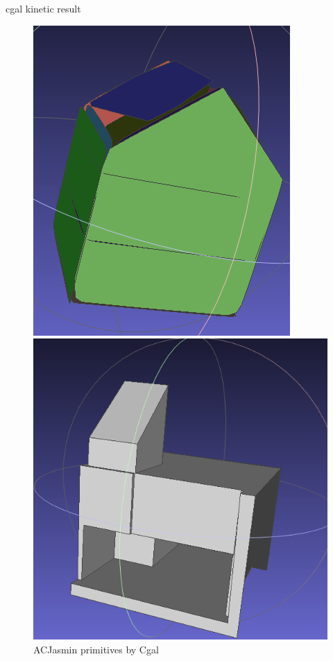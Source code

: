\documentclass[10pt]{beamer}
\begin{document}
\begin{frame}{cgal kinetic result }
    \begin{figure}[H]
        \centering
        \begin{minipage}[t]{0.29\textwidth}
          \includegraphics[width=\textwidth]{../../images/screen_kinetic/ACJasmin_primitive_cgal.png}
          \caption*{ACJasmin primitives by Cgal}
        \end{minipage}
        \begin{minipage}[t]{0.35\textwidth}
            \includegraphics[width=\textwidth]{../../images/screen_kinetic/ACJasmin_result_CGAL.png}

\end{minipage}
\end{figure}
\end{frame}
\end{document}
